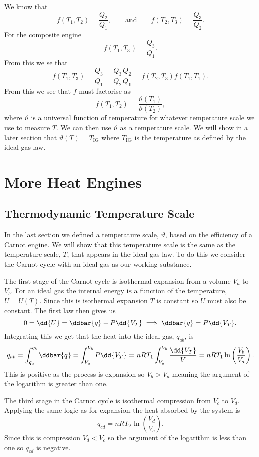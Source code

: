     We know that
    \[f(T_1, T_2) = \frac{Q_2}{Q_1},\qquad\text{and}\qquad f(T_2, T_3) = \frac{Q_3}{Q_2}.\]
    For the composite engine
    \[f(T_1, T_3) = \frac{Q_3}{Q_1}.\]
    From this we se that
    \[f(T_1, T_3) = \frac{Q_3}{Q_1} = \frac{Q_3}{Q_2}\frac{Q_2}{Q_1} = f(T_2, T_3)f(T_1, T_1).\]
    From this we see that \(f\) must factorise as
    \[f(T_1, T_2) = \frac{\vartheta(T_1)}{\vartheta(T_2)},\]
    where \(\vartheta\) is a universal function of temperature for whatever temperature scale we use to measure \(T\).
    We can then use \(\vartheta\) as a temperature scale.
    We will show in a later section that \(\vartheta(T) = T_\text{IG}\) where \(T_\text{IG}\) is the temperature as defined by the ideal gas law.
    
    \section{More Heat Engines}
    \subsection{Thermodynamic Temperature Scale}
    In the last section we defined a temperature scale, \(\vartheta\), based on the efficiency of a Carnot engine.
    We will show that this temperature scale is the same as the temperature scale, \(T\), that appears in the ideal gas law.
    To do this we consider the Carnot cycle with an ideal gas as our working substance.
    
    The first stage of the Carnot cycle is isothermal expansion from a volume \(V_a\) to \(V_b\).
    For an ideal gas the internal energy is a function of the temperature, \(U = U(T)\).
    Since this is isothermal expansion \(T\) is constant so \(U\) must also be constant.
    The first law then gives us
    \[0 = \dd{U} = \ddbar{q} - P\dd{V_T} \implies \ddbar{q} = P\dd{V_T}.\]
    Integrating this we get that the heat into the ideal gas, \(q_{ab}\), is
    \[q_{ab} = \int_{q_a}^{q_b} \ddbar{q} = \int_{V_a}^{V_b} P\dd{V_T} = nRT_1 \int_{V_a}^{V_b} \frac{\dd{V_T}}{V} = nRT_1 \ln\left(\frac{V_b}{V_a}\right).\]
    This is positive as the process is expansion so \(V_b > V_a\) meaning the argument of the logarithm is greater than one.
    
    The third stage in the Carnot cycle is isothermal compression from \(V_c\) to \(V_d\).
    Applying the same logic as for expansion the heat absorbed by the system is
    \[q_{cd} = nRT_2\ln\left(\frac{V_d}{V_c}\right).\]
    Since this is compression \(V_d < V_c\) so the argument of the logarithm is less than one so \(q_{cd}\) is negative.
    
